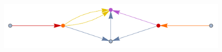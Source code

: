 \documentclass[../FeynCalcManual.tex]{subfiles}
\begin{document}
\begin{Shaded}
\begin{Highlighting}[]
\OperatorTok{[}\OperatorTok{,}\OperatorTok{[[}\OperatorTok{]],}  \OtherTok{{-}\textgreater{}} \OperatorTok{]}
\end{Highlighting}
\end{Shaded}

\FloatBarrier
\begin{figure}[!ht]
\centering
\includegraphics[width=0.6\linewidth]{img/0n46uoe6w24dg.pdf}
\end{figure}
\FloatBarrier

\begin{Shaded}
\begin{Highlighting}[]
\ExtensionTok{=} \OperatorTok{\{}\SpecialCharTok{{-}} \OtherTok{{-}\textgreater{}} \OperatorTok{,} \SpecialCharTok{{-}} \OtherTok{{-}\textgreater{}} \OperatorTok{,} \SpecialCharTok{{-}} \OtherTok{{-}\textgreater{}} \OperatorTok{,} \SpecialCharTok{{-}} \OtherTok{{-}\textgreater{}} \OperatorTok{,}  \OtherTok{{-}\textgreater{}} \OperatorTok{,}  \OtherTok{{-}\textgreater{}} \OperatorTok{,}  \OtherTok{{-}\textgreater{}} \OperatorTok{,} 
     \OtherTok{{-}\textgreater{}} \OperatorTok{,}  \OtherTok{{-}\textgreater{}} \OperatorTok{,}  \OtherTok{{-}\textgreater{}} \OperatorTok{,}  \OtherTok{{-}\textgreater{}} \OperatorTok{\}}\NormalTok{;}
\end{Highlighting}
\end{Shaded}

\begin{Shaded}
\begin{Highlighting}[]
\OperatorTok{[}\OperatorTok{,}  \OtherTok{{-}\textgreater{}} \OperatorTok{]}
\end{Highlighting}
\end{Shaded}
\end{document}
